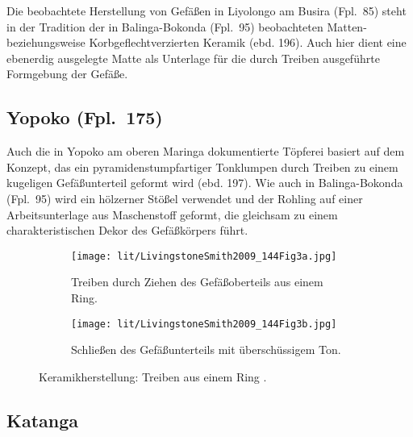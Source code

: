 Die beobachtete Herstellung von Gefäßen in Liyolongo am Busira (Fpl.~85) steht in der Tradition der in Balinga-Bokonda (Fpl.~95) beobachteten Matten- beziehungsweise Korbgeflechtverzierten Keramik (ebd. 196). Auch hier dient eine ebenerdig ausgelegte Matte als Unterlage für die durch Treiben ausgeführte Formgebung der Gefäße.


\subsection*{Yopoko (Fpl.~175)}

Auch die in Yopoko am oberen Maringa dokumentierte Töpferei basiert auf dem Konzept, das ein pyramidenstumpfartiger Tonklumpen durch Treiben zu einem kugeligen Gefäßunterteil geformt wird (ebd. 197). Wie auch in Balinga-Bokonda (Fpl.~95) wird ein hölzerner Stößel verwendet und der Rohling auf einer Arbeitsunterlage aus Maschenstoff geformt, die gleichsam zu einem charakteristischen Dekor des Gefäßkörpers führt.


\begin{figure*}[!tb]
	\centering
	\begin{subfigure}[t]{0.49\textwidth}
		\centering
		\texttt{[image: lit/LivingstoneSmith2009\_144Fig3a.jpg]}
		\caption{Treiben durch Ziehen des Gefäßoberteils aus einem Ring.}
		\label{fig:LivingstoneSmith2009_144Fig3a}
	\end{subfigure}
	\begin{subfigure}[t]{0.49\textwidth}
		\centering
		\texttt{[image: lit/LivingstoneSmith2009\_144Fig3b.jpg]}
		\caption{Schließen des Gefäßunterteils mit überschüssigem Ton.}
		\label{fig:LivingstoneSmith2009_144Fig3b}
	\end{subfigure}
	\caption{Keramikherstellung: Treiben aus einem Ring \parencite[144 Abb.~3]{LivingstoneSmith.2009}.}
	\label{fig:LivingstoneSmith2009_144Fig3}
\end{figure*}

\subsection*{Katanga}


